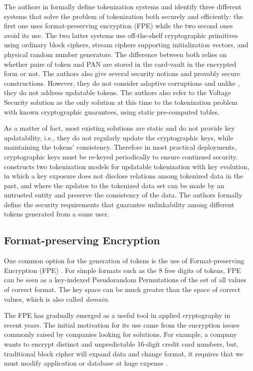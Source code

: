\documentclass{llncs}
\newcounter{prob}
\begin{document}
The authors in \cite{Diaz2014} formally define tokenization systems and identify three different systems that solve the problem of tokenization both securely and efficiently: the first one uses format-preserving encryption (FPE) while the two second ones avoid its use. The two latter systems use off-the-shelf cryptographic primitives using ordinary block ciphers, stream ciphers supporting initialization vectors, and physical random number generators. The difference between both relies on whether pairs of token and PAN are stored in the card-vault in the encrypted form or not. The authors also give several security notions and provably secure constructions. However, they do not consider adaptive corruptions and unlike \cite{Cachin2017}, they do not address updatable tokens.
The authors also refer to the Voltage Security solution \cite{Voltage} as the only solution at this time to the tokenization problem with known cryptographic guarantees, using static pre-computed tables.

As a matter of fact, most existing solutions are static and do not provide key updatability, i.e., they do not regularly update the cryptographic keys, while maintaining the tokens' consistency. Therefore in most practical deployments, cryptographic keys must be re-keyed periodically to ensure continued security.
\cite{Cachin2017} constructs two tokenization models for updatable tokenization with key evolution, in which a key exposure does not disclose relations among tokenized data in the past, and where the updates to the tokenized data set can be made by an untrusted entity and preserve the consistency of the data. The authors formally define the security requirements that guarantee unlinkability among different tokens generated from a same user.

\subsection{Format-preserving Encryption}

One common option for the generation of tokens is the use of Format-preserving Encryption (FPE) \cite{Bellare2009}. For simple formats such as the 8 free digits of tokens, FPE can be seen as a key-indexed Pseudorandom Permutations of the set of all values of correct format. The key space can be much greater than the space of correct values, which is also called \textit{domain}.

The FPE has gradually emerged as a useful tool in applied cryptography in recent years. The initial motivation for its use came from the encryption issues commonly raised by companies looking for solutions. For example, a company wants to encrypt distinct and unpredictable 16-digit credit card numbers, but, traditional block cipher will expand data and change format, it requires that we must modify application or database at huge expense \cite{liu2010format}.
\end{document}
